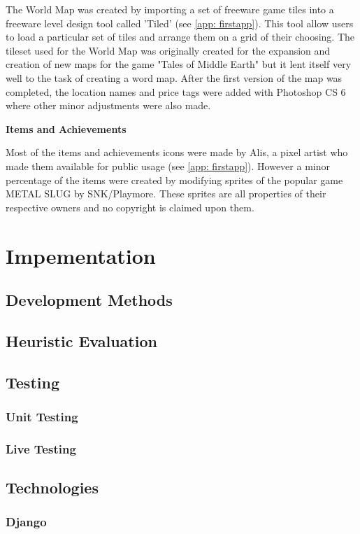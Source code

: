 \documentclass{mproj}
\begin{document}
The World Map was created by importing a set of freeware game tiles into a freeware level design tool called 'Tiled' (see \ref{app: firstapp}). This tool allow users to load a particular set of tiles and arrange them on a grid of their choosing. The tileset used for the World Map was originally created for the expansion and creation of new maps for the game "Tales of Middle Earth" but it lent itself very well to the task of creating a word map. After the first version of the map was completed, the location names and price tags were added with Photoshop CS 6 where other minor adjustments were also made.

\textbf{Items and Achievements}

Most of the items and achievements icons were made by Alis, a pixel artist who made them available for public usage (see \ref{app: firstapp}). However a minor percentage of the items were created by modifying sprites of the popular game METAL SLUG  by SNK/Playmore. These sprites are all properties of their respective owners and no copyright is claimed upon them. 


\chapter{Impementation}
\label{implementation}
\section{Development Methods}
\section{Heuristic Evaluation}
\section{Testing}
\subsection{Unit Testing}
\subsection{Live Testing}
\section{Technologies}
\subsection{Django}
\label{subsec:Django}
\end{document}
